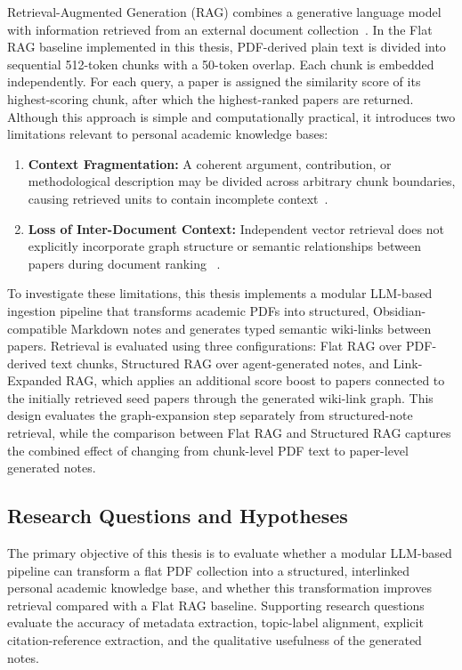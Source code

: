 \documentclass[runningheads]{llncs}
\begin{document}
Retrieval-Augmented Generation (RAG) combines a generative language model
with information retrieved from an external document
collection~\cite{lewis2020retrieval}. In the Flat RAG baseline
implemented in this thesis, PDF-derived plain text is divided into
sequential 512-token chunks with a 50-token overlap. Each chunk is
embedded independently. For each query, a paper is assigned the
similarity score of its highest-scoring chunk, after which the
highest-ranked papers are returned. Although this approach is simple and
computationally practical, it introduces two limitations relevant to
personal academic knowledge bases:

\begin{enumerate}
\item \textbf{Context Fragmentation:} A coherent argument,
contribution, or methodological description may be divided across
arbitrary chunk boundaries, causing retrieved units to contain
incomplete context~\cite{sarthi2024raptor}.

\item \textbf{Loss of Inter-Document Context:} Independent vector
retrieval does not explicitly incorporate graph structure or semantic
relationships between papers during document ranking
~\cite{edge2024local,gutierrez2024hipporag}.
\end{enumerate}

To investigate these limitations, this thesis implements a modular
LLM-based ingestion pipeline that transforms academic PDFs into
structured, Obsidian-compatible Markdown notes and generates typed
semantic wiki-links between papers. Retrieval is evaluated using three
configurations: Flat RAG over PDF-derived text chunks, Structured RAG
over agent-generated notes, and Link-Expanded RAG, which applies an
additional score boost to papers connected to the initially retrieved
seed papers through the generated wiki-link graph. This design evaluates
the graph-expansion step separately from structured-note retrieval, while
the comparison between Flat RAG and Structured RAG captures the combined
effect of changing from chunk-level PDF text to paper-level generated
notes.

\subsection{Research Questions and Hypotheses}
\label{sec:rqs}

The primary objective of this thesis is to evaluate whether a modular
LLM-based pipeline can transform a flat PDF collection into a structured,
interlinked personal academic knowledge base, and whether this
transformation improves retrieval compared with a Flat RAG baseline.
Supporting research questions evaluate the accuracy of metadata
extraction, topic-label alignment, explicit citation-reference
extraction, and the qualitative usefulness of the generated notes.
\end{document}
